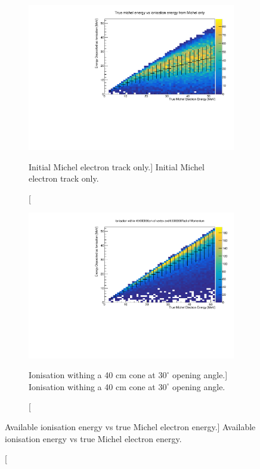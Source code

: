 \begin{figure}
	\centering

	\begin{subfigure}[b]{\textwidth}
		\includegraphics[clip, trim = 0cm 0cm 0cm 1cm, width=\textwidth]{figures/michel_track_only.pdf}
		\caption
		[Initial Michel electron track only.]
		{Initial Michel electron track only.}
		\label{fig:track_only}
	\end{subfigure}

	\vspace{5mm}

	\begin{subfigure}[b]{\textwidth}
		\includegraphics[clip, trim = 0cm 0cm 0cm 1cm, width=\textwidth]{figures/cone_reco.pdf}
		\caption
		[Ionisation withing a 40 cm cone at $30^\circ$ opening angle.]
		{Ionisation withing a 40 cm cone at $30^\circ$ opening angle.}
		\label{fig:cone_reco}
	\end{subfigure}

	\caption
	[Available ionisation energy vs true Michel electron energy.]
	{Available ionisation energy vs true Michel electron energy.}

	\label{fig:michel_track_only}

\end{figure}

